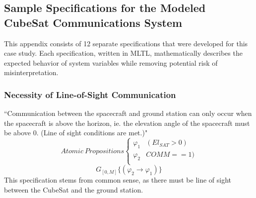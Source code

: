 \begin{comment}
Current":0.40367200000000003,"LI 3V3 Voltage":3.302,"LI VBATT Current":-0.19264799999999999,"LI VBATT Voltage":8.243400000000001,"Lithium #RX":0,"Lithium #TX":261648,"Lithium MSP430 Temp":0,"Lithium Op Count":11731,"Lithium PA Temp":22.85666520419977,"Lithium RSSI":97,"NumResets":548, "5VSbVolt":5.1200,"5VSbCurr":.0008,"3.3VSbVolt":3.3160,"3.3VSbCurr":.0005,"1.5VSbVolt"1.4930,"1.5VSbCurr":.0004,"Operation Mode":0,"Output Regulator Temperature":24.662146180000008,"PIM 3v3 current":-0.129,"PIM 3v3 voltage":0,"PIM VBatt monitor":0,"RTC Unix Time":1579207577,"SD Usage":0,"SD V (?)":0,"STAMP GPIO States":29809,"TBEx Payload Current":-0.227,"TBEx Payload Voltage":0,"avgNumActiveTasks1":1.64,"avgNumActiveTasks15":1.81,"avgNumActiveTasks5":1.82,"data_checksum_passed":true,"flag":3,"freeMemPlusCache":107632,"header_checksum_passed":true,"pid":0,"sid":83,"telemetry_archive":false,"telemetry_archive_file_num":0,"totNumProcesses":41,"usedMemMinusCache":19272}}
\end{lstlisting}

\end{comment}

\subsection{Sample Specifications for the Modeled CubeSat Communications System}

This appendix consists of 12 separate specifications that were developed for this case study. Each specification, written in MLTL, mathematically describes the expected behavior of system variables while removing potential risk of misinterpretation.

\subsubsection{\textbf{Necessity of Line-of-Sight Communication}}
“Communication between the spacecraft and ground station can only occur when the spacecraft is above the horizon, ie. the elevation angle of the spacecraft must be above 0. (Line of sight conditions are met.)"
\[ Atomic\:Propositions \begin{cases}
  \varphi_1 & (El_{SAT} > 0) \\
  \varphi_2 & COMM == 1) \\
\end{cases} \]
\begin{equation}
    \label{Spec 1}
    G_{[0,M]} \{(\varphi_2 \rightarrow \varphi_1)\}
\end{equation} 
This specification stems from common sense, as there must be line of sight between the CubeSat and the ground station.

